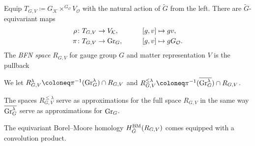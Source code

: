 \begin{definition}
	Equip $T_{G,V} \coloneq G_\mathcal{K} \times^{G_\mathcal{O}} V_\mathcal{O}$ with the natural action of $\tilde G$ from the left. There are $\tilde G$-equivariant maps
	\begin{align}
		\rho & \colon T_{G,V} \to V_\mathcal{K}, \qquad &&[g,v] \mapsto gv, \\
		\pi & \colon T_{G,V} \to \textup{Gr}_G, \qquad &&[g,v] \mapsto g G_\mathcal{O}.
	\end{align}
	The \emph{BFN space} $R_{G,V}$ for gauge group $G$ and matter representation $V$ is the pullback
	\begin{center}
	\end{center}
	We let $R_{G,V}^\lambda \coloneq \pi^{-1}(\textup{Gr}_G^\lambda) \cap R_{G,V}$ and $R_{G,V}^{\leq \lambda} \coloneq \pi^{-1}(\overline{\textup{Gr}_G^\lambda}) \cap R_{G,V}$.
\end{definition}

\begin{remark}
	The spaces $R_{G,V}^{\leq \lambda}$ serve as approximations for the full space $R_{G,V}$ in the same way $\overline{\textup{Gr}_G^\lambda}$ serve as approximations for $\textup{Gr}_G$.
\end{remark}

\begin{prop}
	The equivariant Borel--Moore homology $H_{\tilde G}^\textup{BM}(R_{G,V})$ comes equipped with a convolution product.
\end{prop}

